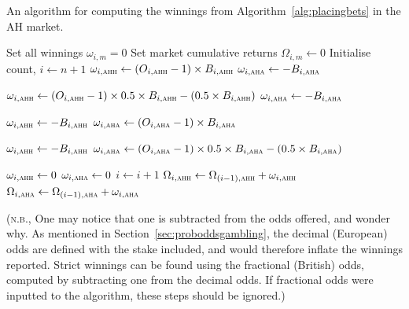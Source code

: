 \documentclass[a4paper,10pt]{report}
\begin{document}
\begin{algorithm}
	\caption{An algorithm for computing the winnings from Algorithm~\ref{alg:placingbets} in the AH market.}\label{alg:winningsah}
	\begin{algorithmic}[1]		
		 
		\State Set all winnings $\omega_{i,m} = 0$
		\State Set market cumulative returns $\Omega_{i,m}\leftarrow 0$
		\State Initialise count, $i \leftarrow n+1$ 
		\State $\omega_{i, \textsc{ahh}}\leftarrow (O_{i,\textsc{ahh}} - 1)\times B_{i, \textsc{ahh}}$ 
		\State $\omega_{i, \textsc{aha}}\leftarrow -B_{i, \textsc{aha}}$
		
		\State $\omega_{i, \textsc{ahh}}\leftarrow (O_{i,\textsc{ahh}} - 1)\times 0.5 \times B_{i, \textsc{ahh}} - (0.5\times B_{i, \textsc{ahh}})$
		\State $\omega_{i, \textsc{aha}}\leftarrow -B_{i, \textsc{aha}}$
		
		\State $\omega_{i, \textsc{ahh}}\leftarrow -B_{i, \textsc{ahh}}$
		\State $\omega_{i, \textsc{aha}}\leftarrow (O_{i,\textsc{aha}} - 1)\times B_{i, \textsc{aha}}$ 
		
		\State $\omega_{i, \textsc{ahh}}\leftarrow -B_{i, \textsc{ahh}}$
		\State $\omega_{i, \textsc{aha}}\leftarrow (O_{i,\textsc{aha}} - 1)\times 0.5 \times B_{i, \textsc{aha}} - (0.5\times B_{i, \textsc{aha}})$
		
		\Else {}
		\State $\omega_{i, \textsc{ahh}}\leftarrow 0$
		\State $\omega_{i, \textsc{aha}}\leftarrow 0$
		\EndIf
		\State $i\leftarrow i + 1$ 
		\State $\Omega_{i,\textsc{ahh}} \leftarrow \Omega_{(i-1),\textsc{ahh}} + \omega_{i,\textsc{ahh}}$ 
		\State $\Omega_{i,\textsc{aha}} \leftarrow \Omega_{(i-1),\textsc{aha}} + \omega_{i,\textsc{aha}}$
		\EndWhile
		\State{}
		\EndFunction		
	\end{algorithmic}
\end{algorithm}

(\textsc{n.b.}, One may notice that one is subtracted from the odds offered, and wonder why. As mentioned in Section~\ref{sec:proboddsgambling}, the decimal (European) odds are defined with the stake included, and would therefore inflate the winnings reported. Strict winnings can be found using the fractional (British) odds, computed by subtracting one from the decimal odds. If fractional odds were inputted to the algorithm, these steps should be ignored.)
\end{document}
